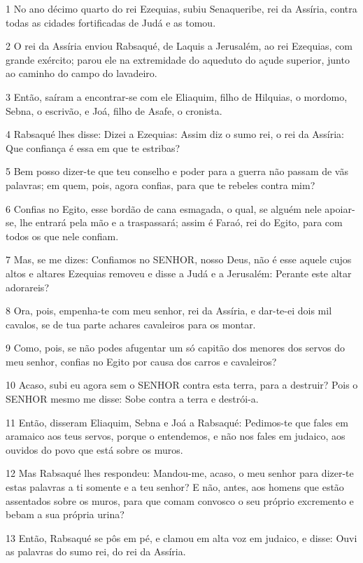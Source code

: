 \par 1 No ano décimo quarto do rei Ezequias, subiu Senaqueribe, rei da Assíria, contra todas as cidades fortificadas de Judá e as tomou.
\par 2 O rei da Assíria enviou Rabsaqué, de Laquis a Jerusalém, ao rei Ezequias, com grande exército; parou ele na extremidade do aqueduto do açude superior, junto ao caminho do campo do lavadeiro.
\par 3 Então, saíram a encontrar-se com ele Eliaquim, filho de Hilquias, o mordomo, Sebna, o escrivão, e Joá, filho de Asafe, o cronista.
\par 4 Rabsaqué lhes disse: Dizei a Ezequias: Assim diz o sumo rei, o rei da Assíria: Que confiança é essa em que te estribas?
\par 5 Bem posso dizer-te que teu conselho e poder para a guerra não passam de vãs palavras; em quem, pois, agora confias, para que te rebeles contra mim?
\par 6 Confias no Egito, esse bordão de cana esmagada, o qual, se alguém nele apoiar-se, lhe entrará pela mão e a traspassará; assim é Faraó, rei do Egito, para com todos os que nele confiam.
\par 7 Mas, se me dizes: Confiamos no SENHOR, nosso Deus, não é esse aquele cujos altos e altares Ezequias removeu e disse a Judá e a Jerusalém: Perante este altar adorareis?
\par 8 Ora, pois, empenha-te com meu senhor, rei da Assíria, e dar-te-ei dois mil cavalos, se de tua parte achares cavaleiros para os montar.
\par 9 Como, pois, se não podes afugentar um só capitão dos menores dos servos do meu senhor, confias no Egito por causa dos carros e cavaleiros?
\par 10 Acaso, subi eu agora sem o SENHOR contra esta terra, para a destruir? Pois o SENHOR mesmo me disse: Sobe contra a terra e destrói-a.
\par 11 Então, disseram Eliaquim, Sebna e Joá a Rabsaqué: Pedimos-te que fales em aramaico aos teus servos, porque o entendemos, e não nos fales em judaico, aos ouvidos do povo que está sobre os muros.
\par 12 Mas Rabsaqué lhes respondeu: Mandou-me, acaso, o meu senhor para dizer-te estas palavras a ti somente e a teu senhor? E não, antes, aos homens que estão assentados sobre os muros, para que comam convosco o seu próprio excremento e bebam a sua própria urina?
\par 13 Então, Rabsaqué se pôs em pé, e clamou em alta voz em judaico, e disse: Ouvi as palavras do sumo rei, do rei da Assíria.
